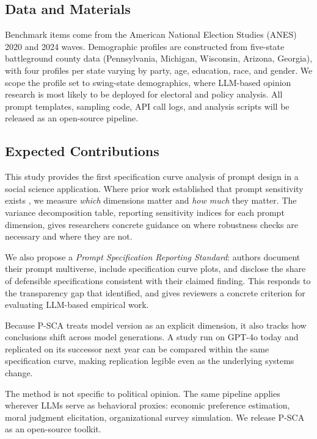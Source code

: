 \documentclass{article}
\begin{document}
\subsection*{Data and Materials}

Benchmark items come from the American National Election Studies (ANES) 2020 and 2024 waves.
Demographic profiles are constructed from five-state battleground county data (Pennsylvania, Michigan, Wisconsin, Arizona, Georgia), with four profiles per state varying by party, age, education, race, and gender.
We scope the profile set to swing-state demographics, where LLM-based opinion research is most likely to be deployed for electoral and policy analysis.
All prompt templates, sampling code, API call logs, and analysis scripts will be released as an open-source pipeline.

\subsection*{Expected Contributions}

This study provides the first specification curve analysis of prompt design in a social science application.
Where prior work established that prompt sensitivity exists \citep{sclar2024quantifying}, we measure \textit{which} dimensions matter and \textit{how much} they matter.
The variance decomposition table, reporting sensitivity indices for each prompt dimension, gives researchers concrete guidance on where robustness checks are necessary and where they are not.

We also propose a \textit{Prompt Specification Reporting Standard}: authors document their prompt multiverse, include specification curve plots, and disclose the share of defensible specifications consistent with their claimed finding.
This responds to the transparency gap that \citet{karell2025integrating} identified, and gives reviewers a concrete criterion for evaluating LLM-based empirical work.

Because P-SCA treats model version as an explicit dimension, it also tracks how conclusions shift across model generations.
A study run on GPT-4o today and replicated on its successor next year can be compared within the same specification curve, making replication legible even as the underlying systems change.

The method is not specific to political opinion.
The same pipeline applies wherever LLMs serve as behavioral proxies: economic preference estimation, moral judgment elicitation, organizational survey simulation.
We release P-SCA as an open-source toolkit.



\end{document}
